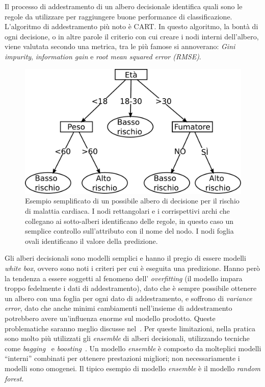 Il processo di addestramento di un albero decisionale identifica quali sono le regole da utilizzare per raggiungere buone performance di classificazione. 
L'algoritmo di addestramento più noto è CART. 
In questo algoritmo, la bontà di ogni decisione, o in altre parole il criterio con cui creare i nodi interni dell'albero, viene valutata secondo una metrica, tra le più famose si annoverano: \emph{Gini impurity}, \emph{information gain} e \emph{root mean squared error (RMSE)}. 
\begin{figure}
    \centering
    \includegraphics[width=0.7\linewidth]{img/decision_tree.pdf}
    \caption{Esempio semplificato di un possibile albero di decisione per il rischio di malattia cardiaca. I nodi rettangolari e i corrispettivi archi che collegano ai sotto-alberi identificano delle regole, in questo caso un semplice controllo sull'attributo con il nome del nodo. I nodi foglia ovali identificano il valore della predizione.}
    \label{fig:decision_tree}
\end{figure}
Gli alberi decisionali sono modelli semplici e hanno il pregio di essere modelli \emph{white box}, ovvero sono noti i criteri per cui è eseguita una predizione.
Hanno però la tendenza a essere soggetti al fenomeno dell' \emph{overfitting} (il modello impara troppo fedelmente i dati di addestramento), dato che è sempre possibile ottenere un albero con una foglia per ogni dato di addestramento, e soffrono di \emph{variance error}, dato che anche minimi cambiamenti nell'insieme di addestramento potrebbero avere un'influenza enorme sul modello prodotto.
Queste problematiche saranno meglio discusse nel~.
Per queste limitazioni, nella pratica sono molto più utilizzati gli \emph{ensemble} di alberi decisionali, utilizzando tecniche come \emph{bagging}~\cite{bagging_predictors} e \emph{boosting}~\cite{adaboost}.
Un modello \emph{ensemble} è composto da molteplici modelli ``interni'' combinati per ottenere prestazioni migliori; non necessariamente i modelli sono omogenei.
Il tipico esempio di modello \emph{ensemble} è il modello \emph{random forest}.

